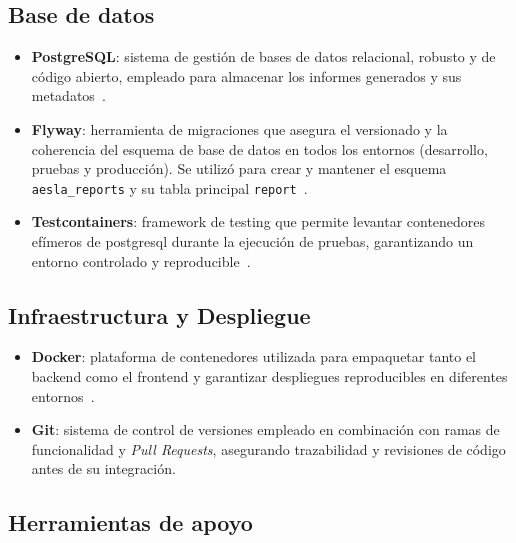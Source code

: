 \documentclass[11pt,a4paper,titlepage,oneside]{report}
\begin{document}
\subsection{Base de datos}

\begin{itemize} 
    \item \textbf{PostgreSQL}: sistema de gestión de bases de datos relacional, robusto y de código abierto, empleado para almacenar los informes generados y sus metadatos~\cite{PostgreSQLDocs}.
    \item \textbf{Flyway}: herramienta de migraciones que asegura el versionado y la coherencia del esquema de base de datos en todos los entornos (desarrollo, pruebas y producción). Se utilizó para crear y mantener el esquema \texttt{aesla\_reports} y su tabla principal \texttt{report}~\cite{FlywayDocs}.
    \item \textbf{Testcontainers}: framework de testing que permite levantar contenedores efímeros de \gls{postgresql} durante la ejecución de pruebas, garantizando un entorno controlado y reproducible~\cite{TestcontainersDocs}.
\end{itemize}

\subsection{Infraestructura y Despliegue}

\begin{itemize}
    \item \textbf{Docker}: plataforma de contenedores utilizada para empaquetar tanto el backend como el frontend y garantizar despliegues reproducibles en diferentes entornos~\cite{DockerDocs}.
    \item \textbf{Git}: sistema de control de versiones empleado en combinación con ramas de funcionalidad y \textit{Pull Requests}, asegurando trazabilidad y revisiones de código antes de su integración.
\end{itemize}

\subsection{Herramientas de apoyo}
\end{document}

